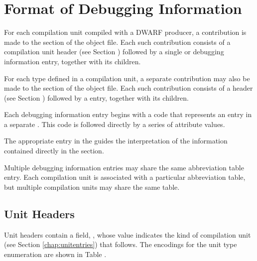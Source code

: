\section{Format of Debugging Information}
\label{datarep:formatofdebugginginformation}

For each compilation unit compiled with a DWARF producer,
a contribution is made to the \dotdebuginfo{} section of
the object file. Each such contribution consists of a
compilation unit header 
(see Section ) 
followed by a single \DWTAGcompileunit{} or 
\DWTAGpartialunit{} debugging
information entry, together with its children.

For each type defined in a compilation unit, a separate
contribution may also be made to the \dotdebuginfo{} 
section of the object file. Each
such contribution consists of a  header 
(see Section ) 
followed by a \DWTAGtypeunit{} entry, together with
its children.

Each debugging information entry begins with a code that
represents an entry in a separate 
. This
code is followed directly by a series of attribute values.

The appropriate entry in the 
 guides the
interpretation of the information contained directly in the
\dotdebuginfo{} section.

Multiple debugging information entries may share the same
abbreviation table entry. Each compilation unit is associated
with a particular abbreviation table, but multiple compilation
units may share the same table.

\subsection{Unit Headers}
\label{datarep:unitheaders}
Unit headers contain a field, \HFNunittype{}, whose value indicates the kind of
compilation unit (see Section \ref{chap:unitentries})
that follows. The encodings for the unit type 
enumeration are shown in Table .

